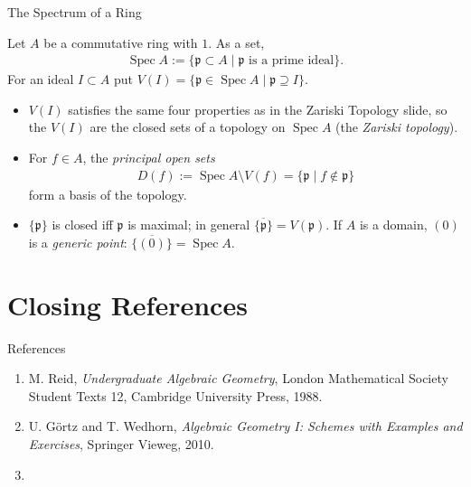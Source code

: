\documentclass[8pt]{beamer}
\DeclareMathOperator{\Spec}{Spec}
\newcommand{\pp}{\mathfrak{p}}
\theoremstyle{definition}
\begin{document}
    \begin{frame}{The Spectrum of a Ring}
        \begin{definition}[$\Spec A$]
            Let $A$ be a commutative ring with $1$. As a set,
            \begin{align*}
                \Spec A := \{ \pp \subset A \mid \pp \text{ is a prime ideal} \}.
            \end{align*}
            For an ideal $I \subset A$ put $V(I) = \{ \pp \in \Spec A \mid \pp \supseteq I \}$.
        \end{definition}
        \begin{itemize}
            \item $V(I)$ satisfies the same four properties as in the Zariski Topology slide, so the $V(I)$ are the closed sets of a topology on $\Spec A$ (the \emph{Zariski topology}).
            \item For $f \in A$, the \emph{principal open sets}
            \begin{align*}
                D(f) := \Spec A \setminus V(f) = \{ \pp \mid f \notin \pp \}
            \end{align*}
            form a basis of the topology.
            \item $\{\pp\}$ is closed iff $\pp$ is maximal; in general $\overline{\{\pp\}} = V(\pp)$. If $A$ is a domain, $(0)$ is a \emph{generic point}: $\overline{\{(0)\}} = \Spec A$.
        \end{itemize}
    \end{frame}

    \section{Closing \text{\&} References}

    \begin{frame}{References}
        \begin{enumerate}
            \item M. Reid, \emph{Undergraduate Algebraic Geometry}, London Mathematical Society Student Texts 12, Cambridge University Press, 1988.
            \item U. G\"ortz and T. Wedhorn, \emph{Algebraic Geometry I: Schemes with Examples and Exercises}, Springer Vieweg, 2010.
            \item 
        \end{enumerate}
        
    \end{frame}
\end{document}
